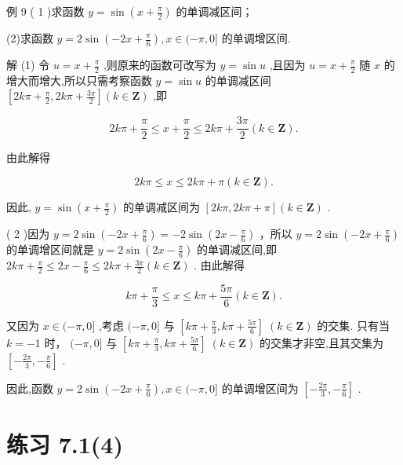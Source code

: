 \documentclass[10pt]{article}
\begin{document}
例 9 ( 1 )求函数 \(y = \sin \left( {x + \frac{\pi }{2}}\right)\) 的单调减区间；

(2)求函数 \(y = 2\sin \left( {-{2x} + \frac{\pi }{6}}\right) ,x \in  ( - \pi ,0\rbrack\) 的单调增区间.

解 (1) 令 \(u = x + \frac{\pi }{2}\) ,则原来的函数可改写为 \(y = \sin u\) ,且因为 \(u = x + \frac{\pi }{2}\) 随 \(x\) 的增大而增大,所以只需考察函数 \(y = \sin u\) 的单调减区间 \(\left\lbrack  {{2k\pi } + \frac{\pi }{2},{2k\pi } + \frac{3\pi }{2}}\right\rbrack  \left( {k \in  \mathbf{Z}}\right)\) ,即

\[
{2k\pi } + \frac{\pi }{2} \leq  x + \frac{\pi }{2} \leq  {2k\pi } + \frac{3\pi }{2}\left( {k \in  \mathbf{Z}}\right) .
\]

由此解得

\[
{2k\pi } \leq  x \leq  {2k\pi } + \pi \left( {k \in  \mathbf{Z}}\right) .
\]

因此, \(y = \sin \left( {x + \frac{\pi }{2}}\right)\) 的单调减区间为 \(\left\lbrack  {{2k\pi },{2k\pi } + \pi }\right\rbrack  \left( {k \in  \mathbf{Z}}\right)\) .

( 2 )因为 \(y = 2\sin \left( {-{2x} + \frac{\pi }{6}}\right)  =  - 2\sin \left( {{2x} - \frac{\pi }{6}}\right)\) ，所以 \(y = 2\sin \left( {-{2x} + \frac{\pi }{6}}\right)\) 的单调增区间就是 \(y = 2\sin \left( {{2x} - \frac{\pi }{6}}\right)\) 的单调减区间,即 \({2k\pi } + \frac{\pi }{2} \leq  {2x} - \frac{\pi }{6} \leq  {2k\pi } + \frac{3\pi }{2}\left( {k \in  \mathbf{Z}}\right)\) . 由此解得

\[
{k\pi } + \frac{\pi }{3} \leq  x \leq  {k\pi } + \frac{5\pi }{6}\left( {k \in  \mathbf{Z}}\right) .
\]

又因为 \(x \in  ( - \pi ,0\rbrack\) ,考虑 \(( - \pi ,0\rbrack\) 与 \(\left\lbrack  {{k\pi } + \frac{\pi }{3},{k\pi } + \frac{5\pi }{6}}\right\rbrack \; \left( {k \in  \mathbf{Z}}\right)\) 的交集. 只有当 \(k =  - 1\) 时， \(( - \pi ,0\rbrack\) 与 \(\left\lbrack  {{k\pi } + \frac{\pi }{3},{k\pi } + \frac{5\pi }{6}}\right\rbrack \; \left( {k \in  \mathbf{Z}}\right)\) 的交集才非空,且其交集为 \(\left\lbrack  {-\frac{2\pi }{3}, - \frac{\pi }{6}}\right\rbrack\) .

因此,函数 \(y = 2\sin \left( {-{2x} + \frac{\pi }{6}}\right) ,x \in  ( - \pi ,0\rbrack\) 的单调增区间为 \(\left\lbrack  {-\frac{2\pi }{3}, - \frac{\pi }{6}}\right\rbrack\) .

\section*{练习 7.1(4)}
\end{document}
